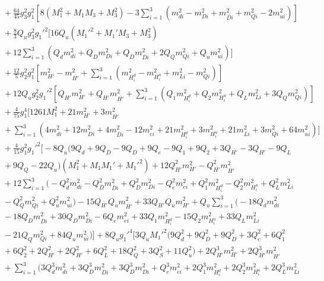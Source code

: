 \documentclass[preprint,amsmath,amssymb,aps,superscriptaddress,prd,showpacs,floatfix,nofootinbib]{revtex4-1}
\begin{document}
\begin{subequations}
\begin{align}
&{}+\frac{64}{45}g_3^2g_1^2\left [ 8\left (M_1^2+M_1M_3+M_3^2\right )-3\sum_{i=1}^3\left ( m_{di}^2-m_{Di}^2+m_{\overline{D}i}^2+m_{Qi}^2-2m_{ui}^2\right )\right ]\nonumber\\
&{}+\frac{8}{3}Q_ug_3^2g_1'^2\bigg [ 16Q_u\left (M_1'^2+M_1'M_3+M_3^2\right )\nonumber\\
&{}+12\sum_{i=1}^3\left ( Q_dm_{di}^2+Q_Dm_{Di}^2+Q_{\overline{D}}m_{\overline{D}i}^2+2Q_Qm_{Qi}^2+Q_um_{ui}^2\right )\bigg ]\nonumber\\
&{}+\frac{12}{5}g_2^2g_1^2\left [ m_{H'}^2-m_{\overline{H'}}^2+\sum_{i=1}^3\left ( m_{H_i^d}^2-m_{H_i^u}^2+m_{Li}^2-m_{Qi}^2\right )\right ]\nonumber\\
&{}+12Q_ug_2^2g_1'^2\left [ Q_{H'}m_{H'}^2+Q_{\overline{H'}}m_{\overline{H'}}^2+\sum_{i=1}^3\left ( Q_1m_{H_i^d}^2+Q_2m_{H_i^u}^2+Q_Lm_{Li}^2+3Q_Qm_{Qi}^2\right )\right ]\nonumber\\
&{}+\frac{4}{75}g_1^4\bigg [ 1261M_1^2+21m_{H'}^2+3m_{\overline{H'}}^2\nonumber\\
&{}+\sum_{i=1}^3\left ( 4m_{di}^2+12m_{Di}^2+4m_{\overline{D}i}^2-12m_{ei}^2+21m_{H_i^d}^2+3m_{H_i^u}^2+21m_{Li}^2+3m_{Qi}^2+64m_{ui}^2\right )\bigg ]\nonumber\\
&{}+\frac{4}{15}g_1^2g_1'^2\bigg [ -8Q_u\big ( 9Q_d+9Q_{\overline{D}}-9Q_D+9Q_e-9Q_1+9Q_2+3Q_{\overline{H'}}-3Q_{H'}-9Q_L\nonumber\\
&{}+9Q_Q-22Q_u\big )\left ( M_1^2+M_1M_1'+M_1'^2 \right )+12Q_{H'}^2m_{H'}^2-Q_{\overline{H'}}^2m_{\overline{H'}}^2\nonumber\\
&{}+12\sum_{i=1}^3\big ( -Q_d^2m_{di}^2-Q_{\overline{D}}^2m_{\overline{D}i}^2+Q_D^2m_{Di}^2-Q_e^2m_{ei}^2+Q_1^2m_{H_i^d}^2-Q_2^2m_{H_i^u}^2+Q_L^2m_{Li}^2\nonumber\\
&{}-Q_Q^2m_{Qi}^2+Q_u^2m_{ui}^2\big )-15Q_{\overline{H'}}Q_um_{\overline{H'}}^2+33Q_{H'}Q_um_{H'}^2+Q_u\sum_{i=1}^3\big ( -18Q_dm_{di}^2\nonumber\\
&{}-18Q_{\overline{D}}m_{\overline{D}i}^2+30Q_Dm_{Di}^2-6Q_em_{ei}^2+33Q_1m_{H_i^d}^2-15Q_2m_{H_i^u}^2+33Q_Lm_{Li}^2\nonumber\\
&{}-21Q_Qm_{Qi}^2+84Q_um_{ui}^2\big )\bigg ]+8Q_ug_1'^4\bigg [ 3Q_uM_1'^2\big ( 9Q_d^2+9Q_{\overline{D}}^2+9Q_D^2+3Q_e^2+6Q_1^2\nonumber\\
&{}+6Q_2^2+2Q_{\overline{H'}}^2+2Q_{H'}^2+6Q_L^2+18Q_Q^2+3Q_S^2+11Q_u^2 \big )+2Q_{H'}^3m_{H'}^2+2Q_{\overline{H'}}^3m_{\overline{H'}}^2\nonumber\\
&{}+\sum_{i=1}^3\big ( 3Q_d^3m_{di}^2+3Q_{\overline{D}}^3m_{\overline{D}i}^2+3Q_D^3m_{Di}^2+Q_e^3m_{ei}^2+2Q_1^3m_{H_i^d}^2+2Q_2^3m_{H_i^u}^2+2Q_L^3m_{Li}^2\nonumber\\

\end{align}
\end{subequations}
\end{document}
